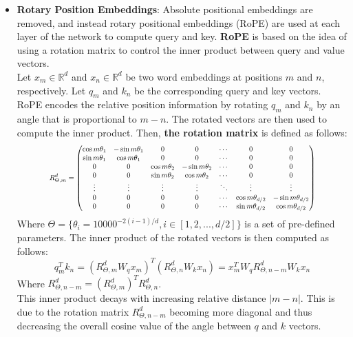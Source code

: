 \documentclass{article}
\newcommand\scalemath[2]{\scalebox{#1}{\mbox{\ensuremath{\displaystyle #2}}}}
\begin{document}
\begin{itemize}
			\item 
				\textbf{Rotary Position Embeddings}: Absolute positional embeddings are removed, and instead rotary positional embeddings (RoPE)  \cite{su2023roformerenhancedtransformerrotary} are used at each layer of the network to compute query and key. \textbf{RoPE} is based on the idea of using a rotation matrix to control the inner product between query and value vectors. \\
				Let $x_m \in \mathbb{R}^d$ and $x_n \in \mathbb{R}^d$ be two word embeddings at positions $m$ and $n$, respectively. Let $q_m$ and $k_n$ be the corresponding query and key vectors. RoPE encodes the relative position information by rotating $q_m$ and $k_n$ by an angle that is proportional to $m-n$. The rotated vectors are then used to compute the inner product. Then, \textbf{the rotation matrix} is defined as follows: 
				\begin{equation}
					\scalemath{0.75}{
						R^d_{\Theta,m} = 
						\begin{pmatrix}
							\cos{m\theta_1}& -\sin{m\theta_1}&0&0&\cdots&0&0\\
							\sin{m\theta_1}&\cos{m\theta_1}&0&0&\cdots&0&0 \\
							0&0&\cos{m\theta_2}& -\sin{m\theta_2}&\cdots&0&0\\
							0&0&\sin{m\theta_2}&\cos{m\theta_2}&\cdots&0&0 \\
							\vdots&\vdots&\vdots&\vdots&\ddots&\vdots&\vdots\\
							0&0&0&0&\cdots&\cos{m\theta_{d/2}}& -\sin{m\theta_{d/2}}\\
							0&0&0&0&\cdots&\sin{m\theta_{d/2}}&\cos{m\theta_{d/2}}
						\end{pmatrix}
					}
					\label{fn:rope-RMat}
				\end{equation}
				Where $\Theta = \{\theta_i = 10000^{-2(i-1)/d}, i \in [1, 2, ..., d/2]\}$ is a set of pre-defined parameters.
				The inner product of the rotated vectors is then computed as follows:
				\begin{equation}
					q_m^T k_n = (R_{\Theta,m}^{d} W_q x_m)^T (R_{\Theta,n}^{d} W_k x_n) = x_m^T W_q R_{\Theta,n-m}^{d} W_k x_n
					\label{q_k_inner_product}
				\end{equation}
				Where $R_{\Theta,n-m}^{d} = (R_{\Theta,m}^{d})^T R_{\Theta,n}^{d}$. \\
				This inner product decays with increasing relative distance $|m - n|$. This is due to the rotation matrix $R_{\Theta,n-m}^{d}$ becoming more diagonal and thus decreasing the overall cosine value of the angle between $q$ and $k$ vectors.
				
				
		\end{itemize}
		
\end{document}
